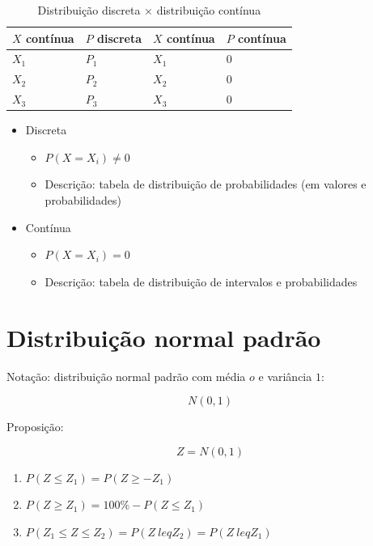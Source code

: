 \documentclass[a4paper]{article}
\begin{document}
	\begin{table}[h]
		\centering
		\caption{Distribuição discreta $\times$ distribuição contínua}
		\label{tab:pbinomialc}
		\begin{tabular}{l|l|l|l}
			\textbf{$X$ contínua} & \textbf{$P$ discreta} & \textbf{$X$ contínua} & \textbf{$P$ contínua} \\ \hline
			$X_1$ & $P_1$ & $X_1$ & $0$ \\
			$X_2$ & $P_2$ & $X_2$ & $0$ \\
			$X_3$ & $P_3$ & $X_3$ & $0$
		\end{tabular}
	\end{table}

	\begin{itemize}
		\item Discreta
		\begin{itemize}
			\item $P(X=X_i) \neq 0$
			\item Descrição: tabela de distribuição de probabilidades (em valores e probabilidades)
		\end{itemize}
		\item Contínua
		\begin{itemize}
			\item $P(X=X_i) = 0$
			\item Descrição: tabela de distribuição de intervalos e probabilidades
		\end{itemize}
	\end{itemize}
	
	\section{Distribuição normal padrão}
	
	Notação: distribuição normal padrão com média $o$ e variância $1$:
	
	\begin{equation*}
		N(0,1)
	\end{equation*}
	
	Proposição:
	
	\begin{equation*}
	Z = N(0,1)
	\end{equation*}
	
	\begin{enumerate}
		\item $P(Z \leq Z_1) = P(Z \geq -Z_1)$
		\item $P(Z \geq Z_1) = 100\% - P(Z \leq Z_1)$
		\item $P(Z_1 \leq Z \leq Z_2) = P(Z \ leq Z_2) = P(Z \ leq Z_1)$
	\end{enumerate}
	
\end{document}
